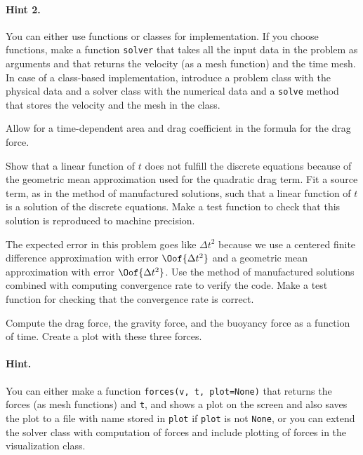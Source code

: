 \documentclass[graybox,sectrefs,envcountresetchap,open=right,final]{svmonodo}
\newenvironment{doconceexercise}{}{}
\begin{document}
\begin{doconceexercise}


\paragraph{Hint 2.}
You can either use functions or classes for implementation.
If you choose functions, make a function
\texttt{solver} that takes all the input data in the problem as
arguments and that returns the velocity (as a mesh function) and
the time mesh. In case of a class-based implementation, introduce
a problem class with the physical data
and a solver class with the numerical data and a \texttt{solve} method
that stores the velocity and the mesh in the class.

Allow for a time-dependent area and drag coefficient in the
formula for the drag force.



Show that a linear function of $t$ does not fulfill the discrete
equations because of the geometric mean approximation
used for the quadratic drag
term.  Fit a source term, as in the method of manufactured solutions,
such that a linear function of $t$ is a solution of the discrete
equations. Make a test function to check that this solution is reproduced
to machine precision.


The expected error in this problem goes like $\Delta t^2$ because we
use a centered finite difference approximation with error $\Oof{\Delta t^2}$
and a geometric mean approximation with error $\Oof{\Delta t^2}$.
Use the method of manufactured solutions combined with computing
convergence rate to verify the code. Make a test function for checking
that the convergence rate is correct.


Compute the drag force, the gravity
force, and the buoyancy force as a function of time. Create
a plot with these three forces.


\paragraph{Hint.}
You can either make a function \texttt{forces(v, t, plot=None)}
that returns the forces (as mesh functions) and \texttt{t}, and shows
a plot on the screen and also saves the plot to a file with name
stored in \texttt{plot}
if \texttt{plot} is not \texttt{None}, or you can extend the solver class with
computation of forces and include plotting of forces in the
visualization class.


\end{doconceexercise}
\end{document}
